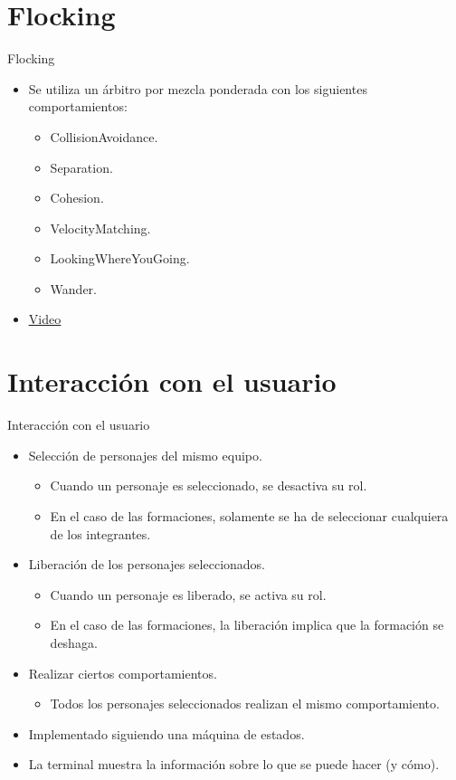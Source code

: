 \documentclass[10pt]{beamer}
\begin{document}
\section{Flocking}
\begin{frame}{Flocking}
\begin{itemize}[<+- | alert@+>]
	\item Se utiliza un árbitro por mezcla ponderada con los siguientes comportamientos:
	\begin{itemize}[<+- | alert@+>]
		\item CollisionAvoidance.
		\item Separation.
		\item Cohesion.
		\item VelocityMatching.
		\item LookingWhereYouGoing.
		\item Wander.
	\end{itemize}
	\item \href{videos/TestFlocking.mp4}{\color{blue}\underline{Video}}
\end{itemize}
\end{frame}

\section{Interacción con el usuario}
\begin{frame}{Interacción con el usuario}
\begin{itemize}[<+- | alert@+>]
	\item Selección de personajes del mismo equipo.
	\begin{itemize}[<+- | alert@+>]
	 \item Cuando un personaje es seleccionado, se desactiva su rol.
	 \item En el caso de las formaciones, solamente se ha de seleccionar cualquiera de los integrantes. 
	\end{itemize}
    
    \item Liberación de los personajes seleccionados.
    \begin{itemize}[<+- | alert@+>]
	 \item Cuando un personaje es liberado, se activa su rol.
	 \item En el caso de las formaciones, la liberación implica que la formación se deshaga.
	\end{itemize}
    
	\item Realizar ciertos comportamientos.
	\begin{itemize}[<+- | alert@+>]
	 \item Todos los personajes seleccionados realizan el mismo comportamiento.
	\end{itemize}
    
	\item Implementado siguiendo una máquina de estados.
	\item La terminal muestra la información sobre lo que se puede hacer (y cómo).
\end{itemize}
\end{frame}
\end{document}
